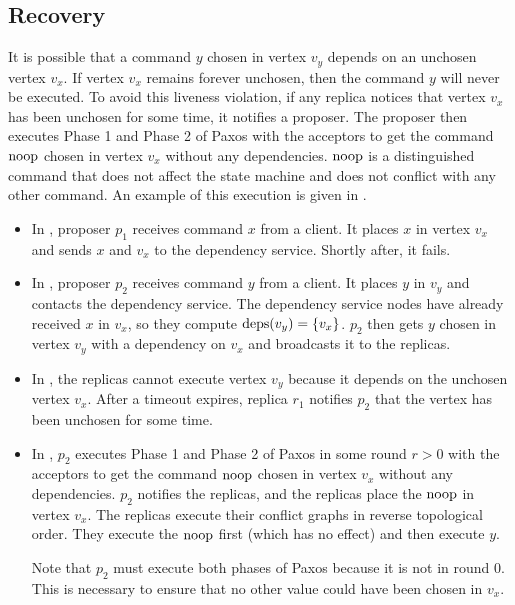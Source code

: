 
\subsection{Recovery}
{}

It is possible that a command $y$ chosen in vertex $v_y$ depends on an unchosen
vertex $v_x$. If vertex $v_x$ remains forever unchosen, then the command $y$
will never be executed. To avoid this liveness violation, if any replica
notices that vertex $v_x$ has been unchosen for some time, it notifies a
proposer. The proposer then executes Phase 1 and Phase 2 of Paxos with the
acceptors to get the command $\text{noop}$ chosen in vertex $v_x$ without any
dependencies. $\text{noop}$ is a distinguished command that does not affect the state
machine and does not conflict with any other command. An example of this
execution is given in .

\begin{itemize}
  \item
    In , proposer $p_1$ receives command
    $x$ from a client. It places $x$ in vertex $v_x$ and sends $x$ and $v_x$ to
    the dependency service. Shortly after, it fails.

  \item
    In , proposer $p_2$ receives command
    $y$ from a client. It places $y$ in $v_y$ and contacts the dependency
    service. The dependency service nodes have already received $x$ in $v_x$,
    so they compute $\text{deps}(v_y) = \{v_x\}$. $p_2$ then gets $y$ chosen in
    vertex $v_y$ with a dependency on $v_x$ and broadcasts it to the replicas.

  \item
    In , the replicas cannot execute
    vertex $v_y$ because it depends on the unchosen vertex $v_x$. After a
    timeout expires, replica $r_1$ notifies $p_2$ that the vertex has been
    unchosen for some time.

  \item
    In , $p_2$ executes Phase 1 and Phase
    2 of Paxos in some round $r > 0$ with the acceptors to get the command
    $\text{noop}$ chosen in vertex $v_x$ without any dependencies. $p_2$ notifies the
    replicas, and the replicas place the $\text{noop}$ in vertex $v_x$. The replicas
    execute their conflict graphs in reverse topological order. They execute
    the $\text{noop}$ first (which has no effect) and then execute $y$.

    Note that $p_2$ must execute both phases of Paxos because it is not in
    round $0$. This is necessary to ensure that no other value could have been
    chosen in $v_x$.
\end{itemize}

